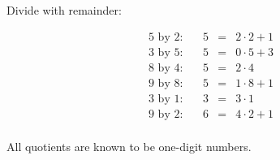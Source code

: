 \begin{frame}
\begin{example}
Divide with remainder:

\[
\begin{array}{rrrcl}
5  \text{ by }2:&&5&=&2\cdot 2 + 1\\
3  \text{ by }5:&&5&=&0\cdot 5 + 3\\
8  \text{ by }4:&&5&=&2\cdot 4 \\
9 \text{ by }8:&&5&=&1\cdot 8 + 1\\
3 \text{ by }1:&&3&=&3\cdot 1\\
9\text{ by }2: &&6&=&4\cdot 2 + 1\\
\end{array}
\]

All quotients are known to be one-digit numbers.
\end{example}

\end{frame}
